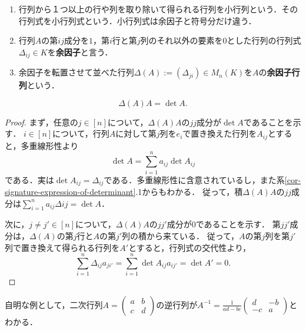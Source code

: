\documentclass[uplatex, dvipdfmx]{jsreport}
\begin{document}
\begin{definition}\mbox{}
    \begin{enumerate}
        \item 行列から１つ以上の行や列を取り除いて得られる行列を小行列という．その行列式を小行列式という．小行列式は余因子と符号分だけ違う．
        \item 行列$A$の第$ij$成分を$1$，第$i$行と第$j$列のそれ以外の要素を$0$とした行列の行列式$\Delta_{ij}\in K$を\textbf{余因子}と言う．
        \item 余因子を転置させて並べた行列$\Delta(A):=(\Delta_{ji})\in M_n(K)$を$A$の\textbf{余因子行列}という．
    \end{enumerate}
\end{definition}

\begin{proposition}[Cramer]\label{prop-Cramer}
    \[\Delta(A)A=\det A.\]
\end{proposition}
\begin{proof}
    まず，任意の$j\in[n]$について，$\Delta(A)A$の$jj$成分が$\det A$であることを示す．
    $i\in[n]$について，行列$A$に対して第$j$列を$e_i$で置き換えた行列を$A_{ij}$とすると，多重線形性より
    \[\det A=\sum^n_{i=1}a_{ij}\det A_{ij}\]
    である．実は$\det A_{ij}=\Delta_{ij}$である．多重線形性に含意されているし，また系\ref{cor-signature-expression-of-determinant}.1からもわかる．
    従って，積$\Delta(A)A$の$jj$成分は$\sum^n_{i=1}a_{ij}\Delta{ij}=\det A$．

    次に，$j\ne j'\in[n]$について，$\Delta(A)A$の$jj'$成分が$0$であることを示す．
    第$jj'$成分は，$\Delta(A)$の第$j$行と$A$の第$j'$列の積から来ている．
    従って，$A$の第$j$列を第$j'$列で置き換えて得られる行列を$A'$とすると，行列式の交代性より，
    \[\sum^n_{i=1}\Delta_{ij}a_{ji'}=\sum^n_{i=1}\det A_{ij}a_{ij'}=\det A'=0.\]
\end{proof}

\begin{example}
    自明な例として，二次行列$A=\begin{pmatrix}a&b\\c&d\end{pmatrix}$の逆行列が$A^{-1}=\frac{1}{ad-bc}\begin{pmatrix}d&-b\\-c&a\end{pmatrix}$とわかる．
\end{example}
\end{document}
